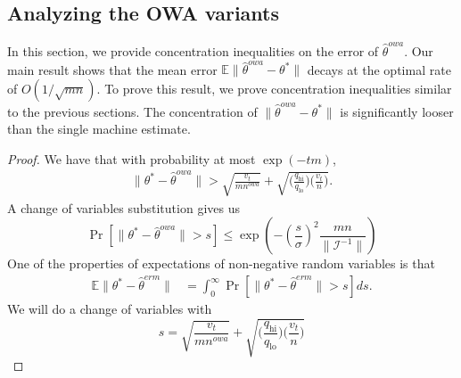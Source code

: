 \documentclass[twoside]{article}
\newcommand{\qhi}{q_\text{hi}}
\newcommand{\qlo}{q_\text{lo}}
\newcommand{\nowa}{n^{\textit{owa}}}
\newcommand{\Wowa}{{\hat \Theta^{\textit{owa}}}}
\newcommand{\E}{\mathbb{E}}
\newcommand{\w}{\theta}
\newcommand{\wowa}{\hat\w^{owa}}
\newcommand{\wowafull}{\hat\w^{\textit{owa,full}}}
\newcommand{\wmle}{\hat\w^{erm}}
\newcommand{\wstar}{{\w^{*}}}
\newcommand{\I}{\mathcal I}
\newcommand{\ltwo}[1]{{\lVert {#1} \rVert}}
\newcommand{\prob}[1]{\Pr\left[{#1}\right]}
\begin{document}

\subsection{Analyzing the OWA variants}

In this section, we provide concentration inequalities on the error of $\wowa$.
Our main result shows that the mean error $\E\ltwo{\wowa-\wstar}$ decays at the optimal rate of $O(1/\sqrt{mn})$.
To prove this result, we prove concentration inequalities similar to the previous sections.
The concentration of $\ltwo{\wowa-\wstar}$ is significantly looser than the single machine estimate.


\begin{proof}
We have that with probability at most $\exp(-tm)$,
\begin{align}
\ltwo{\wstar-\wowa} >
\sqrt{\frac{v_t}{m\nowa}}
+
\sqrt{\bigg(\frac{\qhi}{\qlo}\bigg)\bigg(\frac{v_{t}}{n}\bigg)} 
.
\end{align}
A change of variables substitution gives us
\begin{equation}
\prob{
\ltwo{\wstar-\wowa} > s}
\le \exp(-(\frac{s}{\sigma})^2\frac{mn}{\ltwo{\I^{-1}}})
\end{equation}
One of the properties of expectations of non-negative random variables is that
\begin{align}
\E\ltwo{\wstar-\wmle}
&= 
\int_0^\infty \prob{\ltwo{\wstar-\wmle} > s} ds
.
\end{align}
We will do a change of variables with 
\begin{equation}
s = \sqrt{\frac{v_t}{m\nowa}} 
+
\sqrt{\bigg(\frac{\qhi}{\qlo}\bigg)\bigg(\frac{v_{t}}{n}\bigg)} 
\end{equation}
\end{proof}

%
%
\end{document}
